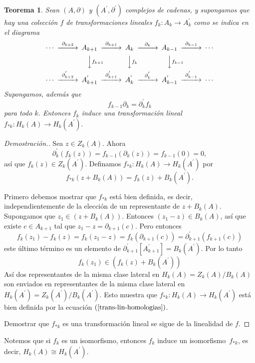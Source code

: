 \documentclass[12pt]{book}
\newtheorem{theorem}{Teorema}[section]
\theoremstyle{definition}
\newcounter{in}
\newcounter{ini}
\begin{document}
\begin{theorem}
  Sean $(A,\partial)$ y $(A^{'},\partial^{'})$ complejos de cadenas, y
  supongamos que hay una colección $f$ de transformaciones lineales
  $f_{k}:A_{k}\rightarrow A^{'}_{k}$ como se indica en el diagrama  
  \[
  \begin{CD}
    \cdots @>{\partial_{k+2}}>> A_{k+1} @>{\partial_{k+1}}>> A_{k} @>{\partial_{k}}>> A_{k-1} @>{\partial_{k-1}}>> \cdots\\
    @.   @VVf_{k+1}V   @VVf_{k}V   @VVf_{k-1}V    \\
    \cdots @>{\partial^{'}_{k+2}}>> A^{'}_{k+1} @>{\partial^{'}_{k+1}}>> A^{'}_{k} @>{\partial^{'}_{k}}>> A^{'}_{k-1} @>{\partial^{'}_{k-1}}>> \cdots
  \end{CD}
  \]
  Supongamos, además que
  $$f_{k-1}\partial_{k}=\partial^{'}_{k}f_{k}$$
  para todo $k$. Entonces $f_{k}$ induce una transformación lineal
  $f_{*k}:H_{k}(A)\rightarrow H_{k}(A^{'}).$
\end{theorem}
\begin{proof}[Demostración.]
  Sea $z\in Z_{k}(A)$. Ahora
  \begin{equation*}
    \partial^{'}_{k}(f_{k}(z))=f_{k-1}(\partial_{k}(z))=f_{k-1}(0)=0,
  \end{equation*}
  así que $f_{k}(z)\in Z_{k}(A^{'})$. Definamos
  $f_{*k}:H_{k}(A)\rightarrow H_{k}(A^{'})$ por
  \begin{equation}
    \label{trans-lin-homologias}
    f_{*k}(z+B_{k}(A))=f_{k}(z)+B_{k}(A^{'}).
  \end{equation}
  
  Primero debemos mostrar que $f_{*k}$ está bien definida, es decir,
  independientemente de la elección de un representante de
  $z+B_{k}(A).$ Supongamos que $z_{1}\in (z+B_{k}(A)).$ Entonces
  $(z_{1}-z)\in B_{k}(A)$, así que existe $c\in A_{k+1}$ tal que
  $z_{1}-z=\partial_{k+1}(c).$ Pero entonces
  $$f_{k}(z_{1})-f_{k}(z)=f_{k}(z_{1}-z)=f_{k}(\partial_{k+1}(c))=\partial^{'}_{k+1}(f_{k+1}(c))$$
  este último término es un elemento de
  $\partial^{'}_{k+1}[A^{'}_{k+1}]=B_{k}(A^{'}).$ Por lo tanto
  $$f_{k}(z_{1})\in (f_{k}(z)+B_{k}(A^{'}))$$
  Así dos representantes de la misma clase lateral en
  $H_{k}(A)=Z_{k}(A)/B_{k}(A)$ son enviados en representantes de la misma
  clase lateral en $H_{k}(A^{'})=Z_{k}(A^{'})/B_{k}(A^{'}).$ Esto muestra
  que $f_{*k}:H_{k}(A)\rightarrow H_{k}(A^{'})$ está bien definida por
  la ecuación $(\ref{trans-lin-homologias})$.
  
  Demostrar que $f_{*k}$ es una transformación lineal se sigue de la
  linealidad de $f$.
\end{proof}
Notemos que si $f_{k}$ es un isomorfismo, entonces $f_{k}$ induce un
isomorfismo~$f_{*k}$, es decir, $H_{k}(A)\cong H_{k}(A^{'})$.
\end{document}
